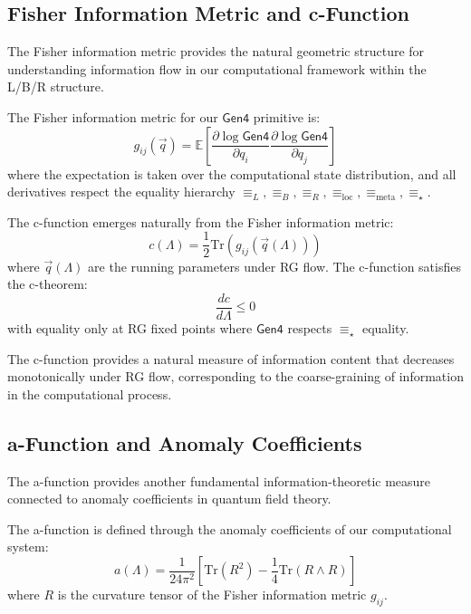 \begin{theorem}
\subsection{Fisher Information Metric and c-Function}

The Fisher information metric provides the natural geometric structure for understanding information flow in our computational framework within the L/B/R structure.

\begin{definition}
\label{def:fisher-metric-g6}
The Fisher information metric for our $\mathsf{Gen4}$ primitive is:
\[
g_{ij}(\vec{q}) = \mathbb{E}\left[\frac{\partial \log \mathsf{Gen4}}{\partial q_i} \frac{\partial \log \mathsf{Gen4}}{\partial q_j}\right]
\]
where the expectation is taken over the computational state distribution, and all derivatives respect the equality hierarchy $\equiv_L, \equiv_B, \equiv_R, \equiv_{\text{loc}}, \equiv_{\text{meta}}, \equiv_\star$.
\end{definition}

\begin{theorem}
\label{thm:c-function-g6}
The c-function emerges naturally from the Fisher information metric:
\[
c(\Lambda) = \frac{1}{2} \text{Tr}(g_{ij}(\vec{q}(\Lambda)))
\]
where $\vec{q}(\Lambda)$ are the running parameters under RG flow. The c-function satisfies the c-theorem:
\[
\frac{dc}{d\Lambda} \leq 0
\]
with equality only at RG fixed points where $\mathsf{Gen4}$ respects $\equiv_\star$ equality.
\end{theorem}

The c-function provides a natural measure of information content that decreases monotonically under RG flow, corresponding to the coarse-graining of information in the computational process.

\subsection{a-Function and Anomaly Coefficients}

The a-function provides another fundamental information-theoretic measure connected to anomaly coefficients in quantum field theory.

\begin{definition}[a-Function]
\label{def:a-function}
The a-function is defined through the anomaly coefficients of our computational system:
\[
a(\Lambda) = \frac{1}{24\pi^2} \left[ \text{Tr}(R^2) - \frac{1}{4}\text{Tr}(R \wedge R) \right]
\]
where $R$ is the curvature tensor of the Fisher information metric $g_{ij}$.
\end{definition}


\end{theorem}

